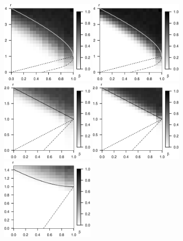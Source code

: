 \begin{figure}
      \centering
      \includegraphics[width=0.4\textwidth]{./figures/simulated_boundaries/simulated_phase_diagram_p100.eps}
      \includegraphics[width=0.4\textwidth]{./figures/simulated_boundaries/simulated_phase_diagram_p10000.eps}
      \includegraphics[width=0.4\textwidth]{./figures/simulated_boundaries/simulated_phase_diagram_Laplace_p100_4.eps}
      \includegraphics[width=0.4\textwidth]{./figures/simulated_boundaries/simulated_phase_diagram_Laplace_p10000_4.eps}
      \includegraphics[width=0.4\textwidth]{./figures/simulated_boundaries/simulated_phase_diagram_NLC_p100.eps}

\end{figure}
